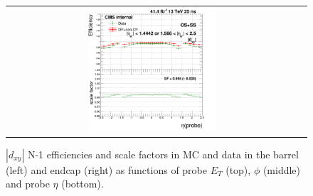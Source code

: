 \begin{figure}[bh]
\begin{center}
\begin{tabular}{cc}
      \includegraphics[width=0.45\textwidth]{figures/Zprime/2017/ScaleFactor/SameSign/N-1/g_compare_cut_eta_Barrel+Endcap_ea_ta_inc_AS_N_1_Dxy_PUW.png}
    \end{tabular}
    \caption{$|d_{xy}|$ N-1 efficiencies and scale factors in MC and data in the barrel (left) and endcap (right) as functions of probe $E_T$ (top), $\phi$ (middle) and probe $\eta$ (bottom).}
    \label{fig:Dxy_2017}
  \end{center}
\end{figure}

